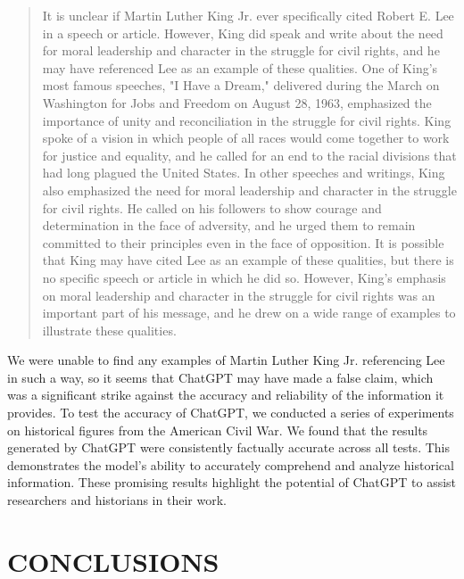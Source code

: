 \documentclass[letterpaper, 10pt, conference]{ieeeconf}
\begin{document}
    \begin{quote}
        
    It is unclear if Martin Luther King Jr. ever specifically cited Robert E. Lee in a speech or article. However, King did
    speak and write about the need for moral leadership and character in the struggle for civil rights, and he may have
    referenced Lee as an example of these qualities. One of King's most famous speeches, "I Have a Dream," delivered during
    the March on Washington for Jobs and Freedom on August 28, 1963, emphasized the importance of unity and
    reconciliation in the struggle for civil rights. King spoke of a vision in which people of all races would come together to
    work for justice and equality, and he called for an end to the racial divisions that had long plagued the United States. In
    other speeches and writings, King also emphasized the need for moral leadership and character in the struggle for civil
    rights. He called on his followers to show courage and determination in the face of adversity, and he urged them to
    remain committed to their principles even in the face of opposition. It is possible that King may have cited Lee as an
    example of these qualities, but there is no specific speech or article in which he did so. However, King's emphasis on
    moral leadership and character in the struggle for civil rights was an important part of his message, and he drew on a
    wide range of examples to illustrate these qualities\cite{navarburnett2023}.
    \end{quote}

    We were unable to find any examples of Martin Luther King Jr. referencing Lee in such a way, so it seems that ChatGPT may have
    made a false claim, which was a significant strike against the accuracy and reliability of the information it provides.
    To test the accuracy of ChatGPT, we conducted a series of experiments on historical figures from the American Civil War. We
    found that the results generated by ChatGPT were consistently factually accurate across all tests. This demonstrates the model's
    ability to accurately comprehend and analyze historical information. These promising results highlight the potential of ChatGPT to
    assist researchers and historians in their work.
    
    \section{CONCLUSIONS}
    
\end{document}
